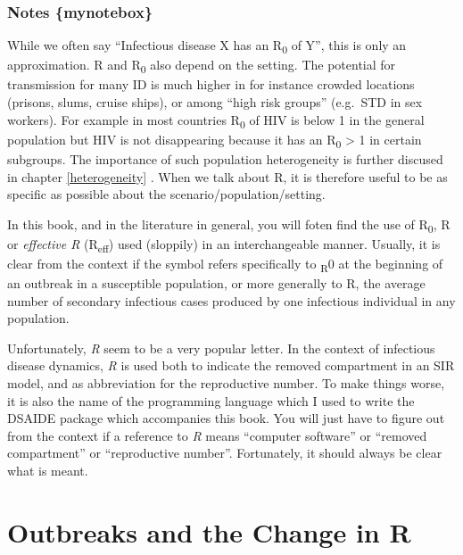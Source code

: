 \documentclass[]{book}
\theoremstyle{definition}
\theoremstyle{definition}
\theoremstyle{definition}
\theoremstyle{remark}
\begin{document}
\subsubsection{Notes \{mynotebox\}}\label{notes-mynotebox}

While we often say ``Infectious disease X has an R\textsubscript{0} of
Y'', this is only an approximation. R and R\textsubscript{0} also depend
on the setting. The potential for transmission for many ID is much
higher in for instance crowded locations (prisons, slums, cruise ships),
or among ``high risk groups'' (e.g.~STD in sex workers). For example in
most countries R\textsubscript{0} of HIV is below 1 in the general
population but HIV is not disappearing because it has an
R\textsubscript{0} \textgreater{} 1 in certain subgroups. The importance
of such population heterogeneity is further discused in chapter
\ref{heterogeneity} . When we talk about R, it is therefore useful to be
as specific as possible about the scenario/population/setting.

In this book, and in the literature in general, you will foten find the
use of R\textsubscript{0}, R or \emph{effective R}
(R\textsubscript{eff}) used (sloppily) in an interchangeable manner.
Usually, it is clear from the context if the symbol refers specifically
to \textsubscript{R}0 at the beginning of an outbreak in a susceptible
population, or more generally to R, the average number of secondary
infectious cases produced by one infectious individual in any
population.

Unfortunately, \emph{R} seem to be a very popular letter. In the context
of infectious disease dynamics, \emph{R} is used both to indicate the
removed compartment in an SIR model, and as abbreviation for the
reproductive number. To make things worse, it is also the name of the
programming language which I used to write the DSAIDE package which
accompanies this book. You will just have to figure out from the context
if a reference to \emph{R} means ``computer software'' or ``removed
compartment'' or ``reproductive number''. Fortunately, it should always
be clear what is meant.

\section{Outbreaks and the Change in
R}\label{outbreaks-and-the-change-in-r}
\end{document}
